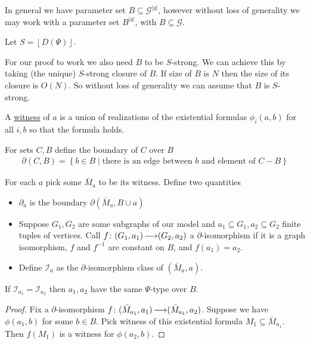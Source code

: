 \documentclass{amsart}
\newcommand{\II}{\mathscr I}
\newcommand{\GG}{\mathcal G}
\newcommand{\defn}{\underline}
\newcommand{\curly}[1]{\left\{#1\right\}}
\providecommand{\floor}[1]{\left \lfloor #1 \right \rfloor }
\begin{document}
In general we have parameter set $B \subseteq \GG^{|y|}$, however without loss of generality we may work with
a parameter set $B^{|y|}$, with $B \subseteq \GG$.

Let $S = \floor{D(\Psi)}$.

For our proof to work we also need $B$ to be $S$-strong.
We can achieve this by taking (the unique) $S$-strong closure of $B$.
If size of $B$ is $N$ then the size of its closure is $O(N)$.	%
So without loss of generality we can assume that $B$ is $S$-strong.

\begin{Definition}
  A \defn{witness} of $a$ is a union of realizations of the existential formulas $\phi_i(a, b)$ for all $i, b$ so that the formula holds.
\end{Definition}

\begin{Definition}
  For sets $C, B$ define the boundary of $C$ over $B$
  \begin{align*}
    \partial(C, B) = \curly{b \in B \mid \text{there is an edge between $b$ and element of $C - B$}}
  \end{align*}
\end{Definition}

\begin{Definition}
  For each $a$ pick some $\bar M_a$ to be its witness.
  Define two quantities
  \begin{itemize}
  \item $\partial_a$ is the boundary $\partial(\bar M_a, B \cup a)$
  \item Suppose $G_1, G_2$ are some subgraphs of our model and $a_1 \subseteq G_1, a_2 \subseteq G_2$ finite tuples of vertices.
    Call $f \colon (G_1, a_1) \operatorname{\longrightarrow} (G_2, a_2)$ a $\partial$-isomorphism if it is a graph isomorphism,
    $f$ and $f^{-1}$ are constant on $B$, and
    $f(a_1) = a_2$.
  \item Define $\II_a$ as the $\partial$-isomorphism class of $(\bar M_a, a)$.
  \end{itemize}
\end{Definition}

\begin{Lemma} \label {bound_trace}
  If $\II_{a_1} = \II_{a_2}$ then $a_1, a_2$ have the same $\Psi$-type over $B$.
\end{Lemma}

\begin{proof}
  Fix a $\partial$-isomorphism $f \colon (\bar M_{a_1}, a_1) \operatorname{\longrightarrow} (\bar M_{a_1}, a_2)$.
  Suppose we have $\phi(a_1, b)$ for some $b \in B$.
  Pick witness of this existential formula $M_1 \subseteq \bar M_{a_1}$.
  Then $f(M_1)$ is a witness for  $\phi(a_2, b)$.
\end{proof}
\end{document}
